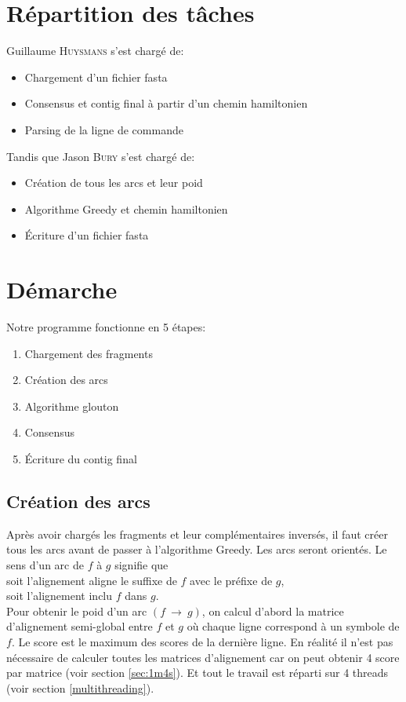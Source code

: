 \documentclass[a4paper, 12pt, titlepage]{article}
\newcommand{\arc}[2]{$(#1~\rightarrow~#2)$}
\begin{document}



\section{Répartition des tâches}
\noindent Guillaume \textsc{Huysmans} s'est chargé de:
\begin{itemize}
 \item Chargement d'un fichier fasta
 \item Consensus et contig final à partir d'un chemin hamiltonien
 \item Parsing de la ligne de commande
\end{itemize}
\noindent Tandis que Jason \textsc{Bury} s'est chargé de:
\begin{itemize}
 \item Création de tous les arcs et leur poid
 \item Algorithme Greedy et chemin hamiltonien
 \item Écriture d'un fichier fasta
\end{itemize}

\section{Démarche}
Notre programme fonctionne en 5 étapes:
\begin{enumerate}
 \item Chargement des fragments
 \item Création des arcs
 \item Algorithme glouton
 \item Consensus
 \item Écriture du contig final
\end{enumerate}

\subsection{Création des arcs}
Après avoir chargés les fragments et leur complémentaires inversés, il faut créer tous les arcs avant de passer à l'algorithme Greedy.
Les arcs seront orientés. Le sens d'un arc de $f$ à $g$ signifie que\\
soit l'alignement aligne le suffixe de $f$ avec le préfixe de $g$,\\
soit l'alignement inclu $f$ dans $g$.\\
Pour obtenir le poid d'un arc \arc{f}{g},
on calcul d'abord la matrice d'alignement semi-global entre $f$ et $g$ où chaque ligne correspond à un symbole de $f$.
Le score est le maximum des scores de la dernière ligne.
En réalité il n'est pas nécessaire de calculer toutes les matrices d'alignement car on peut obtenir 4 score par matrice (voir section \ref{sec:1m4s}).
Et tout le travail est réparti sur 4 threads (voir section \ref{multithreading}).
\end{document}
